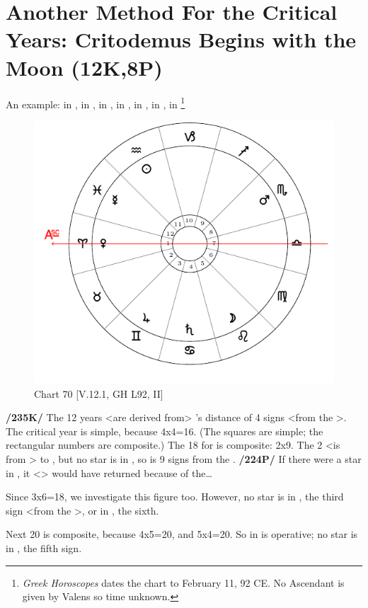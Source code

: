 \section{Another Method For the Critical Years: Critodemus Begins with the Moon (12K,8P)}

An example: \Sun\xspace in \Aquarius, \Moon\xspace in \Leo, \Saturn\xspace in \Cancer, \Jupiter\xspace in \Gemini, \Mars\xspace in \Scorpio, \Venus\xspace in \Aries, \Mercury\xspace in \Pisces\footnote{\textit{Greek Horoscopes} dates the chart to February 11, 92 CE. No Ascendant is given by Valens so time unknown.} 

\begin{figure}
\centering
\vspace{-20pt}
\includegraphics[width=.68\textwidth]{charts/5_12_1}
\caption{Chart 70 [V.12.1, GH L92, II]}
\label{fig:chart70}
\end{figure}

\noindent\textbf{/235K/} The 12 years <are derived from> \Mars’s distance of 4 signs <from the \Moon>. The critical year is simple, because 4x4=16. (The squares are simple; the rectangular numbers are composite.) The 18 for \Venus\xspace is composite: 2x9. The 2 <is from \Leo> to \Virgo, but no star is in \Virgo, so \Venus\xspace is 9 signs from the \Moon. \textbf{/224P/} If there were a star in \Virgo, it <\Venus> would have returned because of the…

Since 3x6=18, we investigate this figure too. However, no star is in \Libra, the third sign <from the \Moon>, or in \Capricorn, the sixth.

Next 20 is composite, because 4x5=20, and 5x4=20. So \Mars\xspace in \Scorpio\xspace <the fourth sign> is operative; no star is in \Sagittarius, the fifth sign.

